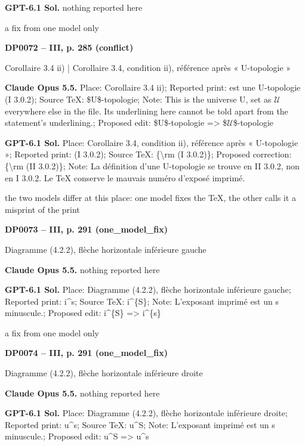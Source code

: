\textbf{GPT-6.1 Sol.} nothing reported here\par
a fix from one model only\par
\par\noindent\hypertarget{DP0072}{}\textbf{DP0072 -- III, p. 285 (conflict)}\par
Corollaire 3.4 ii) | Corollaire 3.4, condition ii), référence après « U-topologie »\par
\textbf{Claude Opus 5.5.} Place: Corollaire 3.4 ii); Reported print: est une U-topologie (I 3.0.2); Source TeX: \$U\$-topologie; Note: This is the universe U, set as \ensuremath{𝒰} everywhere else in the file. Its underlining here cannot be told apart from the statement's underlining.; Proposed edit: \$U\$-topologie =\allowbreak > \$\ensuremath{𝒰}\$-topologie\par
\textbf{GPT-6.1 Sol.} Place: Corollaire 3.4, condition ii), référence après « U-topologie »; Reported print: (I 3.0.2); Source TeX: \{\textbackslash{}rm (I 3.0.2)\}; Proposed correction: \{\textbackslash{}rm (II 3.0.2)\}; Note: La définition d'une U-topologie se trouve en II 3.0.2, non en I 3.0.2. Le TeX conserve le mauvais numéro d'exposé imprimé.\par
the two models differ at this place: one model fixes the TeX, the other calls it a misprint of the print\par
\par\noindent\hypertarget{DP0073}{}\textbf{DP0073 -- III, p. 291 (one\_model\_fix)}\par
Diagramme (4.2.2), flèche horizontale inférieure gauche\par
\textbf{Claude Opus 5.5.} nothing reported here\par
\textbf{GPT-6.1 Sol.} Place: Diagramme (4.2.2), flèche horizontale inférieure gauche; Reported print: i\textasciicircum{}s; Source TeX: i\textasciicircum{}\{S\}; Note: L'exposant imprimé est un s minuscule.; Proposed edit: i\textasciicircum{}\{S\} =\allowbreak > i\textasciicircum{}\{s\}\par
a fix from one model only\par
\par\noindent\hypertarget{DP0074}{}\textbf{DP0074 -- III, p. 291 (one\_model\_fix)}\par
Diagramme (4.2.2), flèche horizontale inférieure droite\par
\textbf{Claude Opus 5.5.} nothing reported here\par
\textbf{GPT-6.1 Sol.} Place: Diagramme (4.2.2), flèche horizontale inférieure droite; Reported print: u\textasciicircum{}s; Source TeX: u\textasciicircum{}S; Note: L'exposant imprimé est un s minuscule.; Proposed edit: u\textasciicircum{}S =\allowbreak > u\textasciicircum{}s\par
